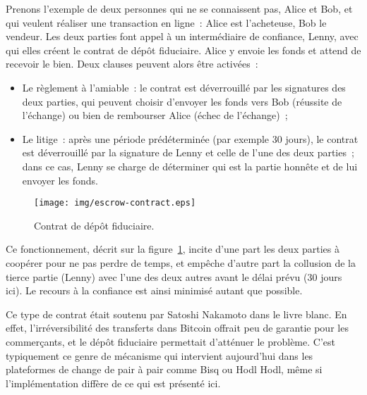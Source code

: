 Prenons l'exemple de deux personnes qui ne se connaissent pas, Alice et Bob, et qui veulent réaliser une transaction en ligne~: Alice est l'acheteuse, Bob le vendeur. Les deux parties font appel à un intermédiaire de confiance, Lenny, avec qui elles créent le contrat de dépôt fiduciaire. Alice y envoie les fonds et attend de recevoir le bien. Deux clauses peuvent alors être activées~:

\begin{itemize}
\item Le règlement à l'amiable~: le contrat est déverrouillé par les signatures des deux parties, qui peuvent choisir d'envoyer les fonds vers Bob (réussite de l'échange) ou bien de rembourser Alice (échec de l'échange)~;
\item Le litige~: après une période prédéterminée (par exemple 30 jours), le contrat est déverrouillé par la signature de Lenny et celle de l'une des deux parties~; dans ce cas, Lenny se charge de déterminer qui est la partie honnête et de lui envoyer les fonds.
\end{itemize}

\begin{figure}[ht]
  \centering
  \texttt{[image: img/escrow-contract.eps]}
  \caption{Contrat de dépôt fiduciaire.}
  \label{fig:escrow-contract}
\end{figure}

Ce fonctionnement, décrit sur la figure~\ref{fig:escrow-contract}, incite d'une part les deux parties à coopérer pour ne pas perdre de temps, et empêche d'autre part la collusion de la tierce partie (Lenny) avec l'une des deux autres avant le délai prévu (30 jours ici). Le recours à la confiance est ainsi minimisé autant que possible.

Ce type de contrat était soutenu par Satoshi Nakamoto dans le livre blanc. En effet, l'irréversibilité des transferts dans Bitcoin offrait peu de garantie pour les commerçants, et le dépôt fiduciaire permettait d'atténuer le problème. C'est typiquement ce genre de mécanisme qui intervient aujourd'hui dans les plateformes de change de pair à pair comme Bisq ou Hodl Hodl, même si l'implémentation diffère de ce qui est présenté ici.


